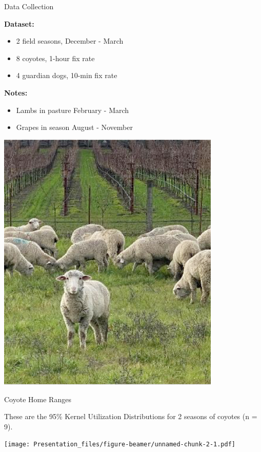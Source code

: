 \documentclass[
  ignorenonframetext,
]{beamer}
\providecommand{\tightlist}{%
  \setlength{\itemsep}{0pt}\setlength{\parskip}{0pt}}
\begin{document}
\begin{frame}{Data Collection}
\protect\hypertarget{data-collection}{}

\textbf{Dataset:}

\begin{itemize}
\tightlist
\item
  2 field seasons, December - March
\item
  8 coyotes, 1-hour fix rate
\item
  4 guardian dogs, 10-min fix rate
\end{itemize}

\textbf{Notes:}

\begin{itemize}
\tightlist
\item
  Lambs in pasture February - March
\item
  Grapes in season August - November
\end{itemize}

\includegraphics[width=0.8\textwidth,height=\textheight]{images/grape.png}

\end{frame}

\begin{frame}{Coyote Home Ranges}
\protect\hypertarget{coyote-home-ranges}{}

These are the 95\% Kernel Utilization Distributions for 2 seasons of
coyotes (n = 9).

\texttt{[image: Presentation\_files/figure-beamer/unnamed-chunk-2-1.pdf]}

\end{frame}
\end{document}
